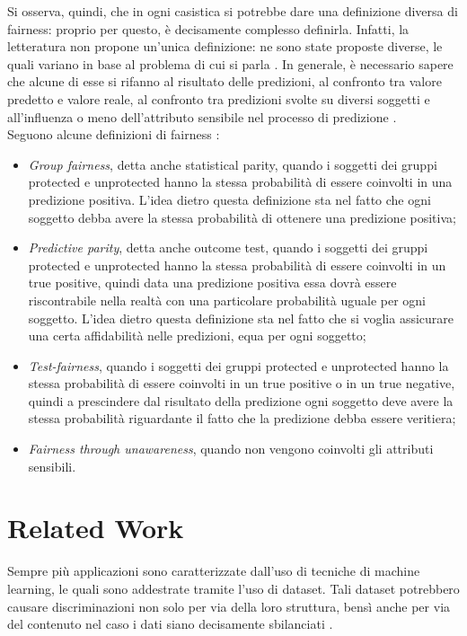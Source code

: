 Si osserva, quindi, che in ogni casistica si potrebbe dare una definizione diversa di fairness: proprio per questo, è decisamente complesso definirla. Infatti, la letteratura non propone un'unica definizione: ne sono state proposte diverse, le quali variano in base al problema di cui si parla \cite{islam2021through}. In generale, è necessario sapere che alcune di esse si rifanno al risultato delle predizioni, al confronto tra valore predetto e valore reale, al confronto tra predizioni svolte su diversi soggetti e all'influenza o meno dell'attributo sensibile nel processo di predizione \cite{verma2018fairness}.\\
Seguono alcune definizioni di fairness \cite{verma2018fairness}:
\begin{itemize}
  \item \emph{Group fairness}, detta anche statistical parity, quando i soggetti dei gruppi protected e unprotected hanno la stessa probabilità di essere coinvolti in una predizione positiva. L'idea dietro questa definizione sta nel fatto che ogni soggetto debba avere la stessa probabilità di ottenere una predizione positiva;
  \item \emph{Predictive parity}, detta anche outcome test, quando i soggetti dei gruppi protected e unprotected hanno la stessa probabilità di essere coinvolti in un true positive, quindi data una predizione positiva essa dovrà essere riscontrabile nella realtà con una particolare probabilità uguale per ogni soggetto. L'idea dietro questa definizione sta nel fatto che si voglia assicurare una certa affidabilità nelle predizioni, equa per ogni soggetto;
  \item \emph{Test-fairness}, quando i soggetti dei gruppi protected e unprotected hanno la stessa probabilità di essere coinvolti in un true positive o in un true negative, quindi a prescindere dal risultato della predizione ogni soggetto deve avere la stessa probabilità riguardante il fatto che la predizione debba essere veritiera;
  \item \emph{Fairness through unawareness}, quando non vengono coinvolti gli attributi sensibili.
\end{itemize}

\section{Related Work}

Sempre più applicazioni sono caratterizzate dall'uso di tecniche di machine learning, le quali sono addestrate tramite l'uso di dataset. Tali dataset potrebbero causare discriminazioni non solo per via della loro struttura, bensì anche per via del contenuto nel caso i dati siano decisamente sbilanciati \cite{vasudevan2020lift}.

